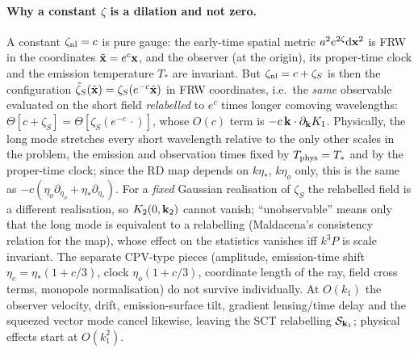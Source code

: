 \paragraph{Why a constant $\zeta$ is a dilation and not zero.}  A constant $\zeta_{\rm nl}=c$ is pure gauge: the early-time
spatial metric $a^2e^{2\zeta}\mathrm d\mathbf x^2$ is FRW in the coordinates $\tilde{\mathbf x}=e^c\mathbf x$, and the observer (at the origin), its proper-time
clock and the emission temperature $T_*$ are invariant.  But $\zeta_{\rm nl}=c+\zeta_S$ is then the configuration
$\tilde\zeta_S(\tilde{\mathbf x})=\zeta_S(e^{-c}\tilde{\mathbf x})$ in FRW coordinates, i.e.\ the \emph{same} observable evaluated on the short field
\emph{relabelled} to $e^{c}$ times longer comoving wavelengths: $\Theta[c+\zeta_S]=\Theta[\zeta_S(e^{-c}\,\cdot)]$, whose $O(c)$ term is
$-c\,\mathbf k\cdot\partial_\mathbf k K_1$.  Physically, the long mode stretches every short wavelength relative to the only other scales in
the problem, the emission and observation times fixed by $T_{\rm phys}=T_*$ and by the proper-time clock; since the RD map depends
on $k\eta_*$, $k\eta_o$ only, this is the same as $-c(\eta_o\partial_{\eta_o}+\eta_*\partial_{\eta_*})$.  For a \emph{fixed} Gaussian
realisation of $\zeta_S$ the relabelled field is a different realisation, so $K_2(0,\mathbf k_2)$ cannot vanish; ``unobservable'' means only
that the long mode is equivalent to a relabelling (Maldacena's consistency relation for the map), whose effect on the statistics
vanishes iff $k^3P$ is scale invariant.  The separate CPV-type pieces (amplitude, emission-time shift $\eta_e=\eta_*(1+c/3)$, clock
$\eta_o(1+c/3)$, coordinate length of the ray, field cross terms, monopole normalisation) do not survive individually.  At $O(k_1)$ the
observer velocity, drift, emission-surface tilt, gradient lensing/time delay and the squeezed vector mode cancel likewise, leaving the
SCT relabelling $\mathcal S_{\mathbf k_1}$; physical effects start at $O(k_1^2)$.


